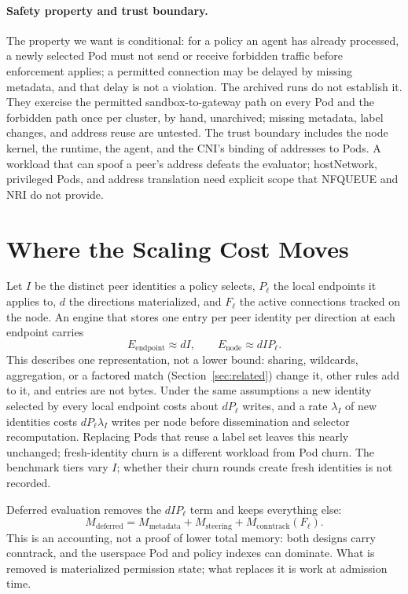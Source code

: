 \paragraph{Safety property and trust boundary.}
The property we want is conditional: for a policy an agent has already
processed, a newly selected Pod must not send or receive forbidden
traffic before enforcement applies; a permitted connection may be delayed
by missing metadata, and that delay is not a violation. The archived runs
do not establish it. They exercise the permitted sandbox-to-gateway path
on every Pod and the forbidden path once per cluster, by hand,
unarchived; missing metadata, label changes, and address reuse are
untested. The
trust boundary includes the node kernel, the runtime, the agent, and the
CNI's binding of addresses to Pods. A workload that can spoof a peer's
address defeats the evaluator; hostNetwork, privileged Pods, and address
translation need explicit scope that NFQUEUE and NRI do not provide.

\section{Where the Scaling Cost Moves}
\label{sec:model}
Let $I$ be the distinct peer identities a policy selects, $P_{\ell}$ the
local endpoints it applies to, $d$ the directions materialized, and
$F_{\ell}$ the active connections tracked on the node. An engine that
stores one entry per peer identity per direction at each endpoint carries
\begin{equation}
E_{\mathrm{endpoint}} \approx dI,\qquad
E_{\mathrm{node}} \approx dIP_{\ell}.
\label{eq:materialization}
\end{equation}
This describes one representation, not a lower bound: sharing,
wildcards, aggregation, or a factored match (Section~\ref{sec:related})
change it, other rules add to it, and entries are not bytes. Under the
same assumptions a new identity selected by every local endpoint costs
about $dP_{\ell}$ writes, and a rate $\lambda_I$ of new identities costs
$dP_{\ell}\lambda_I$ writes per node before dissemination and selector
recomputation. Replacing Pods that reuse a label set leaves this nearly
unchanged; fresh-identity churn is a different workload from Pod churn.
The benchmark tiers vary $I$; whether their churn rounds create fresh
identities is not recorded.

Deferred evaluation removes the $dIP_{\ell}$ term and keeps everything
else:
\begin{equation}
M_{\mathrm{deferred}} = M_{\mathrm{metadata}} +
M_{\mathrm{steering}} + M_{\mathrm{conntrack}}(F_{\ell}).
\end{equation}
This is an accounting, not a proof of lower total memory: both designs
carry conntrack, and the userspace Pod and policy indexes can dominate.
What is removed is materialized permission state; what replaces it is
work at admission time.

